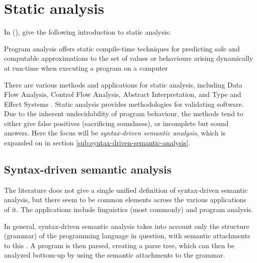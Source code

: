 \documentclass[a4paper,english]{ifimaster}
\begin{document}
\section{Static analysis}
\label{sec:static-analysis}
In  (\citeyear{book:principles-of-program-analysis}), \citeauthor*{book:principles-of-program-analysis} give the following introduction to static analysis:
\begin{displayquote}
Program analysis offers static compile-time techniques for predicting safe and computable approximations to the set of values or behaviours arising dynamically at run-time when executing a program on a computer
\end{displayquote}
There are various methods and applications for static analysis, including Data Flow Analysis, Control Flow Analysis, Abstract Interpretation, and Type and Effect Systems \parencite{book:principles-of-program-analysis}. Static analysis provides methodologies for validating software. Due to the inherent undecidability of program behaviour, the methods tend to either give false positives (sacrificing soundness), or incomplete but sound answers. Here the focus will be \emph{syntax-driven semantic analysis}, which is expanded on in section \vref{sub:syntax-driven-semantic-analysis}. 
\subsection{Syntax-driven semantic analysis}
\label{sub:syntax-driven-semantic-analysis}
The literature does not give a single unified definition of syntax-driven semantic analysis, but there seem to be common elements across the various applications of it. The applications include linguistics (most commonly) and program analysis.

In general, syntax-driven semantic analysis takes into account only the structure (grammar) of the programming language in question, with semantic attachments to this \parencite{art:syntax-driven-manurung}. A program is then parsed, creating a parse tree, which can then be analyzed bottom-up by using the semantic attachments to the grammar\parencite{article:syntax-driven-program-verification, art:inc-syntactic-semantic}.


\end{document}
